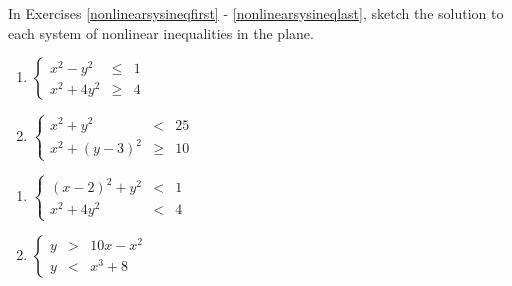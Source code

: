 \documentclass{ximera}
\begin{document}
	\author{Stitz-Zeager}



\label{ExercisesforNonLinearInequalities}

In Exercises \ref{nonlinearsysineqfirst} - \ref{nonlinearsysineqlast}, sketch the solution to each system of nonlinear inequalities in the plane.


\begin{multicols}{2}
\begin{enumerate}


\item $\left\{\begin{array}{rcr}  x^{2} - y^{2} & \leq & 1 \\ x^{2} + 4y^{2} & \geq & 4  \end{array} \right.$ \label{nonlinearsysineqfirst}
\item $\left\{\begin{array}{rcr}  x^{2} + y^{2} & < & 25 \\ x^{2} + (y - 3)^{2} & \geq & 10  \end{array} \right.$

\setcounter{HW}{\value{enumi}}
\end{enumerate}
\end{multicols}

\begin{multicols}{2}
\begin{enumerate}
\setcounter{enumi}{\value{HW}}

\item $\left\{\begin{array}{rcr}  (x - 2)^{2} + y^{2} & < & 1 \\ x^{2} + 4y^{2} & < & 4  \end{array} \right.$
\item $\left\{\begin{array}{rcr}  y & > & 10x - x^{2} \\ y & < & x^{3} + 8  \end{array} \right.$

\setcounter{HW}{\value{enumi}}
\end{enumerate}
\end{multicols}
\end{document}
